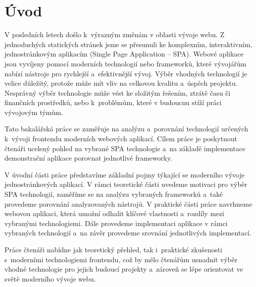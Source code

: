 \section*{Úvod}

V posledních letech došlo k~výrazným změnám v oblasti vývoje webu. 
Z jednoduchých statických stránek jsme se přesunuli ke komplexním, interaktivním, jednostránkovým aplikacím (Single Page Application -- SPA). 
Webové aplikace jsou vyvíjeny pomocí moderních technologií nebo frameworků, které vývojářům nabízí nástroje pro rychlejší a~efektivnější vývoj. 
Výběr vhodných technologií je velice důležitý, protože může mít vliv na celkovou kvalitu a~úspěch projektu. 
Nesprávný výběr technologie může vést ke složitým řešením, ztrátě času či finančních prostředků, nebo k~problémům, které v budoucnu stíží práci vývojovým týmům.

Tato bakalářská práce se zaměřuje na analýzu a~porovnání technologií určených k~vývoji frontendu moderních webových aplikací. 
Cílem práce je poskytnout čtenáři ucelený pohled na vybrané SPA technologie a~na základě implementace demonstrační aplikace porovnat jednotlivé frameworky.

V úvodní části práce představíme základní pojmy týkající se moderního vývoje jednostránkových aplikací. 
V rámci teoretické části uvedeme motivaci pro výběr SPA technologií, zaměříme se na analýzu vybraných frameworků a~také provedeme porovnání analyzovaných nástrojů. 
V praktické části práce navrhneme webovou aplikaci, která umožní odhalit klíčové vlastnosti a~rozdíly mezi vybranými technologiemi. 
Dále provedeme implementaci aplikace v rámci vybraných technologií a~na závěr provedeme srovnání jednotlivých implementací.

Práce čtenáři nabídne jak teoretický přehled, tak i~praktické zkušenosti s~moderními technologiemi frontendu, 
což by mělo čtenářům usnadnit výběr vhodné technologie pro jejich budoucí projekty a~zároveň se lépe orientovat ve světě moderního vývoje webu.


